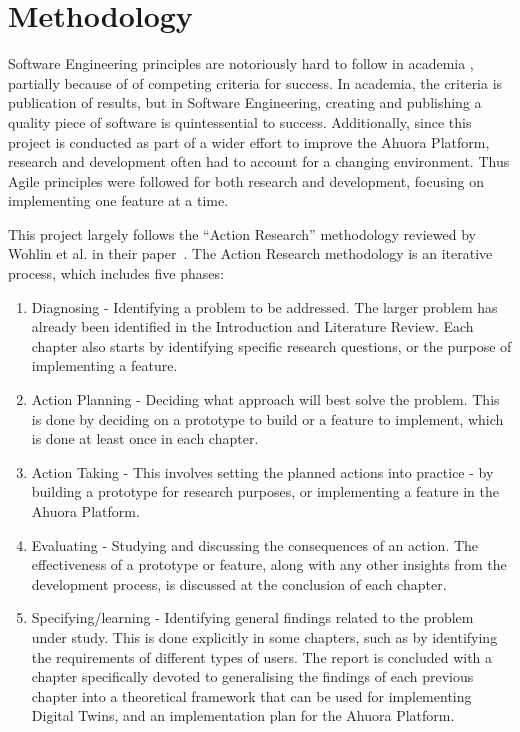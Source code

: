 \chapter{Methodology}

Software Engineering principles are notoriously hard to follow in academia \cite{connolly2023software}, partially because of of competing criteria for success. 
In academia, the criteria is publication of results, but in Software Engineering, creating and publishing a quality piece of software is quintessential to success. 
Additionally, since this project is conducted as part of a wider effort to improve the Ahuora Platform, research and development often had to account for a changing environment. 
Thus Agile principles were followed for both research and development, focusing on implementing one feature at a time. 

This project largely follows the ``Action Research'' methodology reviewed by Wohlin et al. in their paper~\cite{wohlin2021guiding}. The Action Research methodology is an iterative process, which includes five phases:

\begin{enumerate}
    \item Diagnosing - Identifying a problem to be addressed. The larger problem has already been identified in the Introduction and Literature Review. Each chapter also starts by identifying specific research questions, or the purpose of implementing a feature.
    \item Action Planning - Deciding what approach will best solve the problem. This is done by deciding on a prototype to build or a feature to implement, which is done at least once in each chapter.
    \item Action Taking - This involves setting the planned actions into practice - by building a prototype for research purposes, or implementing a feature in the Ahuora Platform.
    \item Evaluating - Studying and discussing the consequences of an action. The effectiveness of a prototype or feature, along with any other insights from the development process, is discussed at the conclusion of each chapter.
    \item Specifying/learning - Identifying general findings related to the problem under study. This is done explicitly in some chapters, such as by identifying the requirements of different types of users. The report is concluded with a chapter specifically devoted to generalising the findings of each previous chapter into a theoretical framework that can be used for implementing Digital Twins, and an implementation plan for the Ahuora Platform. 
\end{enumerate}


